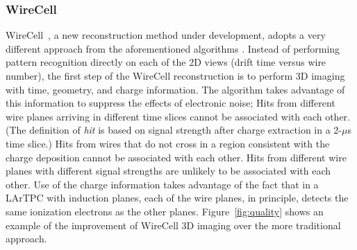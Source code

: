 \subsubsection{WireCell}

WireCell~\cite{wire-cell}, a new reconstruction method under development, adopts a very different approach from the aforementioned algorithms .
Instead of performing pattern recognition directly on each of the 2D views (drift 
time versus wire number), the first step of the WireCell reconstruction is to 
perform 3D imaging with time, geometry, and charge information. 
The algorithm takes advantage of this %
information to suppress the effects of electronic noise;
Hits from  different wire planes arriving in different time 
slices cannot be associated with each other. 
(The definition
of \textit{hit} is based on signal strength after charge extraction %
in a 2-$\mu$s time slice.) Hits
from wires that do not cross in a region consistent with the charge deposition cannot be associated with each other. 
Hits from different wire planes
with different signal strengths are unlikely to be associated with each other. 
Use of the charge information takes advantage of the fact that in a LArTPC with induction planes,
each of the wire planes, in principle, detects the same ionization electrons as the other planes. 
Figure~\ref{fig:quality} shows an example of the improvement of WireCell 3D imaging
over the more traditional approach. 


